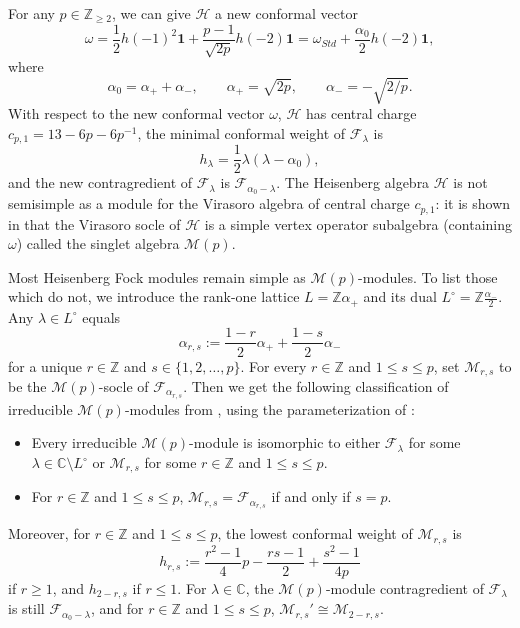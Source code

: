 \documentclass[11pt, reqno]{amsart}
\theoremstyle{definition}\newtheorem{defi}[thm]{Definition}
\theoremstyle{definition}\newtheorem{rem}[thm]{Remark}
\theoremstyle{definition}\newtheorem{exam}[thm]{Example}
\theoremstyle{definition}\newtheorem{assum}[thm]{Assumption}
\newcommand{\cH}{\mathcal{H}}
\newcommand{\cM}{\mathcal{M}}
\newcommand{\cF}{\mathcal{F}}
\newcommand{\CC}{\mathbb{C}}
\newcommand{\ZZ}{\mathbb{Z}}
\newcommand{\vac}{\mathbf{1}}
\begin{document}
For any $p\in\ZZ_{\geq 2}$, we can give $\cH$ a new conformal vector
\begin{equation*}
\omega =\frac{1}{2}h(-1)^2\vac+\frac{p-1}{\sqrt{2p}}h(-2)\vac =\omega_{Std}+\frac{\alpha_0}{2}h(-2)\vac,
\end{equation*}
where
\begin{equation*}
\alpha_0=\alpha_++\alpha_-,\qquad\alpha_+=\sqrt{2p},\qquad\alpha_-=-\sqrt{2/p}.
\end{equation*}
With respect to the new conformal vector $\omega$, $\cH$ has central charge $c_{p,1}=13-6p-6p^{-1}$, the minimal conformal weight of $\cF_\lambda$ is 
\begin{equation*}
h_\lambda =\frac{1}{2}\lambda(\lambda-\alpha_0),
\end{equation*}
and the new contragredient of $\cF_\lambda$ is $\cF_{\alpha_0-\lambda}$. The Heisenberg algebra $\cH$ is not semisimple as a module for the Virasoro algebra of central charge $c_{p,1}$: it is shown in \cite{Ad} that the Virasoro socle of $\cH$ is a simple vertex operator subalgebra (containing $\omega$) called the singlet algebra $\cM(p)$.

Most Heisenberg Fock modules remain simple as $\cM(p)$-modules. To list those which do not, we introduce the rank-one lattice $L=\mathbb{Z}\alpha_+$ and its dual $L^\circ=\ZZ\frac{\alpha_-}{2}$. Any $\lambda\in L^\circ$ equals
\begin{equation*}
\alpha_{r,s}:=\frac{1-r}{2}\alpha_++\frac{1-s}{2}\alpha_-
\end{equation*}
for a unique $r\in\ZZ$ and $s\in\lbrace 1,2,\ldots, p\rbrace$. For every $r\in\ZZ$ and $1\leq s\leq p$, set $\cM_{r,s}$ to be the $\cM(p)$-socle of $\cF_{\alpha_{r,s}}$. Then we get the following classification of irreducible $\cM(p)$-modules from \cite{Ad}, using the parameterization of \cite[Section 2]{CRW}:
\begin{itemize}
\item Every irreducible $\cM(p)$-module is isomorphic to either $\cF_\lambda$ for some $\lambda\in\CC\setminus L^\circ$ or $\cM_{r,s}$ for some $r\in\ZZ$ and $1\leq s\leq p$.

\item For $r\in\ZZ$ and $1\leq s\leq p$, $\cM_{r,s}=\cF_{\alpha_{r,s}}$ if and only if $s=p$.
\end{itemize}
Moreover, for $r\in\ZZ$ and $1\leq s\leq p$, the lowest conformal weight of $\cM_{r,s}$ is
\begin{equation*}
h_{r,s}:=\frac{r^2-1}{4}p-\frac{rs-1}{2}+\frac{s^2-1}{4p}
\end{equation*}
if $r\geq 1$, and $h_{2-r,s}$ if $r\leq 1$. For $\lambda\in\CC$, the $\cM(p)$-module contragredient of $\cF_\lambda$ is still $\cF_{\alpha_0-\lambda}$, and for $r\in\ZZ$ and $1\leq s\leq p$, $\cM_{r,s}'\cong\cM_{2-r,s}$.
\end{document}
